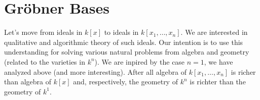 \section{Gröbner Bases}

Let's move from ideals in $k[x]$ to ideals in $k[x_1, \dots, x_n]$. We are interested in qualitative and algorithmic theory of such ideals.
Our intention is to use this understanding for solving various natural problems from algebra and geometry (related to the varieties in $k^n$). 
We are inpired by the case $n =1$, we have analyzed above (and more interesting). After all algebra of $k[x_1, \dots, x_n]$ is richer than algebra of $k[x]$ 
and, respectively, the geometry of $k^n$ is richter than the geometry of $k^1$.
